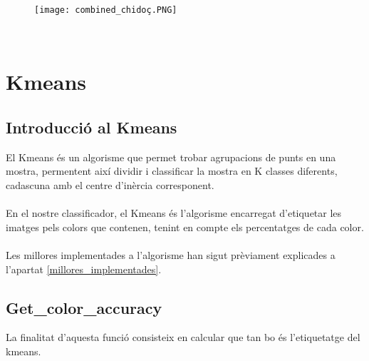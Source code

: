 \documentclass[a4paper, 11pt]{article}
\begin{document}
\begin{figure}[h]
 \centering
    \texttt{[image: combined\_chidoç.PNG]}
\end{figure}\\

\newpage

\section{Kmeans}
\subsection{Introducció al Kmeans}
El Kmeans és un algorisme que permet trobar agrupacions de punts en una mostra, permentent així dividir i classificar la mostra en K classes diferents, cadascuna amb el centre d'inèrcia corresponent.\\\\
En el nostre classificador, el Kmeans és l'algorisme encarregat d'etiquetar les imatges pels colors que contenen, tenint en compte els percentatges de cada color.\\\\
Les millores implementades a l'algorisme han sigut prèviament explicades a l'apartat \textcolor{blue}{\ref{millores_implementades}}.
\newpage
\subsection{Get\_color\_accuracy}\label{matriucolors}
La finalitat d'aquesta funció consisteix en calcular que tan bo és l'etiquetatge del kmeans.
\end{document}
